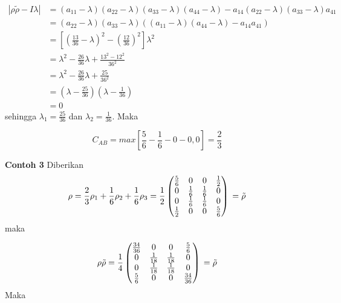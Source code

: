 \begin{equation}
	\begin{aligned}
		|\rho \tilde{\rho}-I\lambda|
		&=(a_{11}-\lambda)(a_{22}-\lambda)(a_{33}-\lambda)(a_{44}-\lambda)-a_{14}(a_{22}-\lambda)(a_{33}-\lambda)a_{41}\\
		&=(a_{22}-\lambda)(a_{33}-\lambda)((a_{11}-\lambda)(a_{44}-\lambda)-a_{14}a_{41})\\
		&=[(\frac{13}{36}-\lambda)^2-(\frac{12}{36})^2]\lambda^2\\
		&=\lambda^2-\frac{26}{36}\lambda+\frac{13^2-12^2}{36^2}\\
		&=\lambda^2-\frac{26}{36}\lambda+\frac{25}{36^2}\\
		&=(\lambda-\frac{25}{36})(\lambda-\frac{1}{36})\\
		&=0
	\end{aligned}
\end{equation}
sehingga $\lambda_1=\frac{25}{36}$ dan $\lambda_2=\frac{1}{36}$. Maka

\begin{equation}
	C_{AB}=max[\frac{5}{6}-\frac{1}{6}-0-0,0]=\frac{2}{3}
\end{equation}

\textbf{Contoh 3}
Diberikan
\begin{equation}
	\rho = \frac{2}{3}\rho_1 + \frac{1}{6}\rho_2
	+\frac{1}{6}\rho_3\\
	=\frac{1}{2}
	\begin{pmatrix}
		\frac{5}{6}&0&0&\frac{1}{2}\\
		0&\frac{1}{6}&\frac{1}{6}&0\\
		0&\frac{1}{6}&\frac{1}{6}&0\\
		\frac{1}{2}&0&0&\frac{5}{6}
	\end{pmatrix}\\
	=\tilde{\rho}
\end{equation}
maka 

\begin{equation}
	\rho \tilde{\rho} =\frac{1}{4}
	\begin{pmatrix}
		\frac{34}{36}&0&0&\frac{5}{6}\\
		0&\frac{1}{18}&\frac{1}{18}&0\\
		0&\frac{1}{18}&\frac{1}{18}&0\\
		\frac{5}{6}&0&0&\frac{34}{36}
	\end{pmatrix}\\
	=\tilde{\rho}
\end{equation}
Maka

